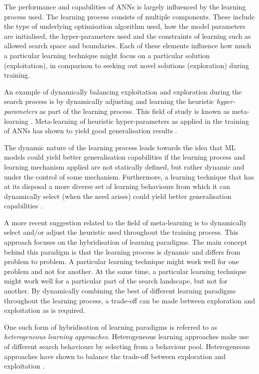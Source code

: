 The performance and capabilities of \acp{ANN} is largely influenced by the learning process used. The learning process consists of multiple components. These include the type of underlying optimisation algorithm used, how the model parameters are initialised, the hyper-parameters used and the constraints of learning such as allowed search space and boundaries. Each of these elements influence how much a particular learning technique might focus on a particular solution (exploitation), in comparison to seeking out novel solutions (exploration) during training.

An example of dynamically balancing exploitation and exploration during the search process is by dynamically adjusting and learning the heuristic \textit{hyper-parameters} as part of the learning process. This field of study is known as meta-learning \cite{ref:giraud:2004}. Meta-learning of heuristic hyper-parameters as applied in the training of \acp{ANN} has shown to yield good generalisation results \cite{ref:hospedales:2020, ref:vilalta:2002}.

The dynamic nature of the learning process leads towards the idea that \ac{ML} models could yield better generalisation capabilities if the learning process and learning mechanism applied are not statically defined, but rather dynamic and under the control of some mechanism. Furthermore, a learning technique that has at its disposal a more diverse set of learning behaviours from which it can dynamically select (when the need arises) could yield better generalisation capabilities \cite{ref:huang:2009}.

A more recent suggestion related to the field of meta-learning is to dynamically select and/or adjust the heuristic used throughout the training process. This approach focuses on the hybridisation of learning paradigms. The main concept behind this paradigm is that the learning process is dynamic and differs from problem to problem. A particular learning technique might work well for one problem and not for another. At the same time, a particular learning technique might work well for a particular part of the search landscape, but not for another. By dynamically combining the best of different learning paradigms throughout the learning process, a trade-off can be made between exploration and exploitation as is required.

One such form of hybridisation of learning paradigms is referred to as \textit{heterogeneous learning approaches}. Heterogeneous learning approaches make use of different search behaviours by selecting from a behaviour pool. Heterogeneous approaches have shown to balance the trade-off between exploration and exploitation \cite{ref:nepomuceno:2013}.

